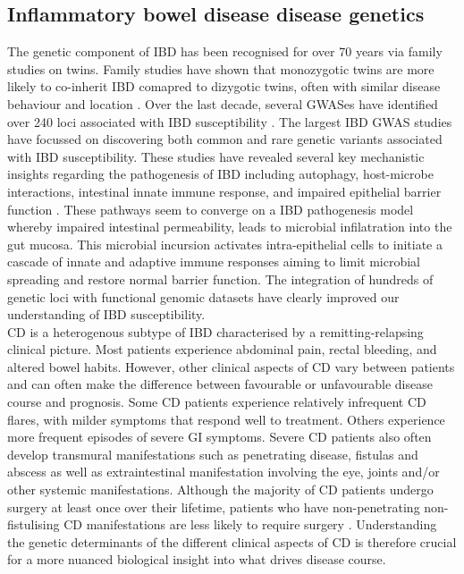 \subsection{Inflammatory bowel disease disease genetics}
The genetic component of IBD has been recognised for over 70 years via family studies on twins. Family studies have shown that monozygotic twins are more likely to co-inherit IBD comapred to dizygotic twins, often with similar disease behaviour and location \cite{Ng2012-mf}. Over the last decade, several GWASes have identified over 240 loci associated with IBD susceptibility \cite{Jostins2012-ig,De_Lange2017-re,Liu2015-bx,Luo2017-kx}. The largest IBD GWAS studies have focussed on discovering both common and rare genetic variants associated with IBD susceptibility. These studies have revealed several key mechanistic insights regarding the pathogenesis of IBD including autophagy, host-microbe interactions, intestinal innate immune response, and impaired epithelial barrier function \cite{Khor2011-td,Jostins2012-ig}. These pathways seem to converge on a IBD pathogenesis model whereby impaired intestinal permeability, leads to microbial infilatration into the gut mucosa. This microbial incursion activates intra-epithelial cells to initiate a cascade of innate and adaptive immune responses aiming to limit microbial spreading and restore normal barrier function. The integration of hundreds of genetic loci with functional genomic datasets have clearly improved our understanding of IBD susceptibility. \\

CD is a heterogenous subtype of IBD characterised by a remitting-relapsing clinical picture. Most patients experience abdominal pain, rectal bleeding, and altered bowel habits. However, other clinical aspects of CD vary between patients and can often make the difference between favourable or unfavourable disease course and prognosis. Some CD patients experience relatively infrequent CD flares, with milder symptoms that respond well to treatment. Others experience more frequent episodes of severe GI symptoms. Severe CD patients also often develop transmural manifestations such as penetrating disease, fistulas and abscess as well as extraintestinal manifestation involving the eye, joints and/or other systemic manifestations. Although the majority of CD patients undergo surgery at least once over their lifetime, patients who have non-penetrating non-fistulising CD manifestations are less likely to require surgery \cite{Lewis2010-gx}. Understanding the genetic determinants of the different clinical aspects of CD is therefore crucial for a more nuanced biological insight into what drives disease course.\\

